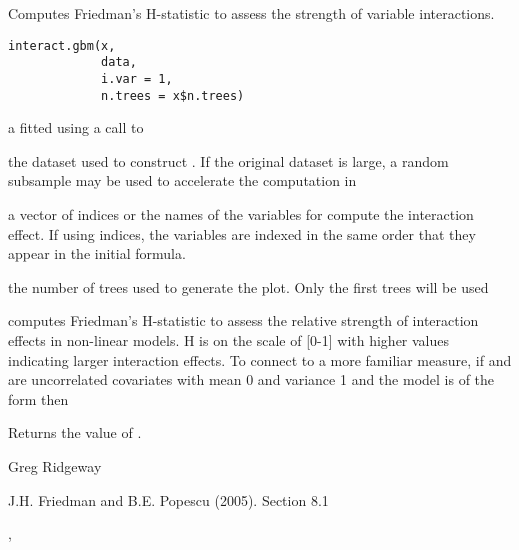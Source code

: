 \begin{Description}\relax
Computes Friedman's H-statistic to assess the strength of variable interactions.
\end{Description}
\begin{Usage}
\begin{verbatim}
interact.gbm(x,
             data,
             i.var = 1,
             n.trees = x$n.trees)
\end{verbatim}
\end{Usage}
\begin{Arguments}
\begin{ldescription}
\item[\code{x}] a  fitted using a call to 
\item[\code{data}] the dataset used to construct . If the original dataset is
large, a random subsample may be used to accelerate the computation in
\item[\code{i.var}] a vector of indices or the names of the variables for compute
the interaction effect. If using indices, the variables are indexed in the
same order that they appear in the initial  formula.
\item[\code{n.trees}] the number of trees used to generate the plot. Only the first
 trees will be used
\end{ldescription}
\end{Arguments}
\begin{Details}\relax
{} computes Friedman's H-statistic to assess the relative
strength of interaction effects in non-linear models. H is on the scale of
[0-1] with higher values indicating larger interaction effects. To connect to
a more familiar measure, if  and  are uncorrelated covariates
with mean 0 and variance 1 and the model is of the form
then
\end{Details}
\begin{Value}
Returns the value of .
\end{Value}
\begin{Author}\relax
Greg Ridgeway 
\end{Author}
\begin{References}\relax
J.H. Friedman and B.E. Popescu (2005).  Section 8.1
\end{References}
\begin{SeeAlso}\relax
{}, 
\end{SeeAlso}

